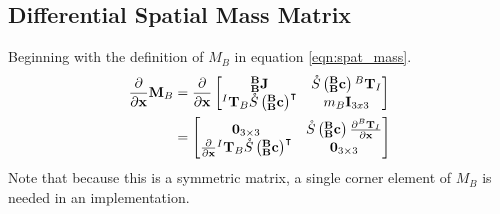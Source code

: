 \subsection{Differential Spatial Mass Matrix}
\noindent Beginning with the definition of $M_B$ in equation \ref{eqn:spat_mass}.
\begin{align} \label{eqn:d_spat_mass}
	\partialx{}\M_B &=
	\partialx{}\begin{bmatrix}
	\BB\J           & \S{\BB\com}{^B\T_I} \\
	 {^I\T_B}\S{\BB\com}\transpose & m_B \EYE_{3x3}   
	\end{bmatrix} \nonumber \\ 
	&=
	\begin{bmatrix}
	\ZERO_{3 \times 3} & \S{\BB\com}\partialx{^B\T_I} \\
	 \partialx{}{^I\T_B}\S{\BB\com}\transpose &\ZERO_{3 \times 3}
	\end{bmatrix}
\end{align}
\noindent Note that because this is a symmetric matrix, a single corner element of $M_B$ is needed in an implementation.


